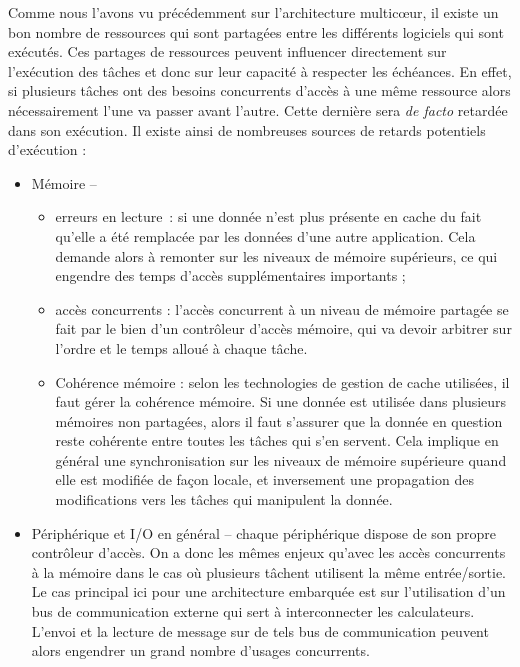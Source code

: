 \documentclass[french, a4paper, 11pt, twoside, pdftex]{StyleThese}
\begin{document}
		Comme nous l'avons vu précédemment sur l'architecture multicœur, il existe un bon nombre de ressources qui sont partagées entre les différents logiciels qui sont exécutés. Ces partages de ressources peuvent influencer directement sur l'exécution des tâches et donc sur leur capacité à respecter les échéances. En effet, si plusieurs tâches ont des besoins concurrents d'accès à une même ressource alors nécessairement l'une va passer avant l'autre. Cette dernière sera \textit{de facto} retardée dans son exécution. Il existe ainsi de nombreuses sources de retards potentiels d'exécution : 
		\begin{itemize}
			\item Mémoire --
			\begin{itemize}[label=$ \circ $] %
				\item 	erreurs en lecture~: si une donnée n'est plus présente en cache du fait qu'elle a été remplacée par les données d'une autre application. Cela demande alors à remonter sur les niveaux de mémoire supérieurs, ce qui engendre des temps d'accès supplémentaires importants ;
				\item 	accès concurrents : l'accès concurrent à un niveau de mémoire partagée se fait par le bien d'un contrôleur d'accès mémoire, qui va devoir arbitrer sur l'ordre et le temps alloué à chaque tâche.
				\item 	Cohérence mémoire : selon les technologies de gestion de cache utilisées, il faut gérer la cohérence mémoire. Si une donnée est utilisée dans plusieurs mémoires non partagées, alors il faut s'assurer que la donnée en question reste cohérente entre toutes les tâches qui s'en servent. Cela implique en général une synchronisation sur les niveaux de mémoire supérieure quand elle est modifiée de façon locale, et inversement une propagation des modifications vers les tâches qui manipulent la donnée.
			\end{itemize}
			\item Périphérique et I/O en général --
				chaque périphérique dispose de son propre contrôleur d'accès. On a donc les mêmes enjeux qu'avec les accès concurrents à la mémoire dans le cas où plusieurs tâchent utilisent la même entrée/sortie. Le cas principal ici pour une architecture embarquée est sur l'utilisation d'un bus de communication externe qui sert à interconnecter les calculateurs. L'envoi et la lecture de message sur de tels bus de communication peuvent alors engendrer un grand nombre d'usages concurrents. 

\end{itemize}
\end{document}
